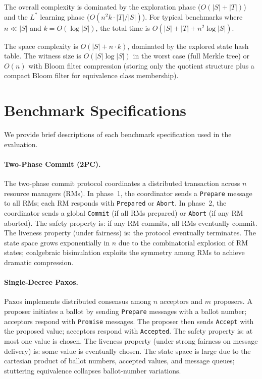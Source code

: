 \documentclass[11pt]{article}
\begin{document}
The overall complexity is dominated by the exploration phase ($O(|S| + |T|)$)
and the $L^*$ learning phase ($O(n^2 k \cdot |T|/|S|)$).
For typical benchmarks where $n \ll |S|$ and $k = O(\log |S|)$, the
total time is $O(|S| + |T| + n^2 \log |S|)$.

The space complexity is $O(|S| + n \cdot k)$, dominated by the explored
state hash table.
The witness size is $O(|S| \log |S|)$ in the worst case (full Merkle tree)
or $O(n)$ with Bloom filter compression (storing only the quotient structure
plus a compact Bloom filter for equivalence class membership).

\section{Benchmark Specifications}
\label{app:benchmarks}

We provide brief descriptions of each benchmark specification used in the
evaluation.

\paragraph{Two-Phase Commit (2PC).}
The two-phase commit protocol coordinates a distributed transaction across
$n$ resource managers (RMs).
In phase~1, the coordinator sends a \texttt{Prepare} message to all RMs;
each RM responds with \texttt{Prepared} or \texttt{Abort}.
In phase~2, the coordinator sends a global \texttt{Commit} (if all RMs
prepared) or \texttt{Abort} (if any RM aborted).
The safety property is: if any RM commits, all RMs eventually commit.
The liveness property (under fairness) is: the protocol eventually terminates.
The state space grows exponentially in $n$ due to the combinatorial
explosion of RM states; coalgebraic bisimulation exploits the symmetry
among RMs to achieve dramatic compression.

\paragraph{Single-Decree Paxos.}
Paxos implements distributed consensus among $n$ acceptors and $m$ proposers.
A proposer initiates a ballot by sending \texttt{Prepare} messages with a
ballot number; acceptors respond with \texttt{Promise} messages.
The proposer then sends \texttt{Accept} with the proposed value;
acceptors respond with \texttt{Accepted}.
The safety property is: at most one value is chosen.
The liveness property (under strong fairness on message delivery) is:
some value is eventually chosen.
The state space is large due to the cartesian product of ballot numbers,
accepted values, and message queues; stuttering equivalence collapses
ballot-number variations.
\end{document}
